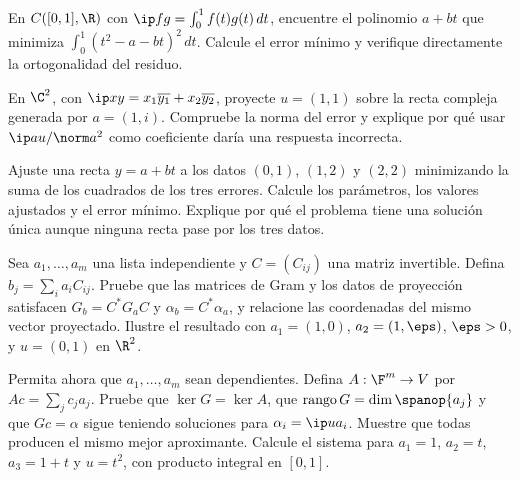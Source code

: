 \begin{ejercicio}\label{ej:ampl-gram-1}
En $C([0,1],\R)$ con $\ip fg=\int_0^1f(t)g(t)\,dt$, encuentre el polinomio $a+bt$ que minimiza $\int_0^1(t^2-a-bt)^2\,dt$. Calcule el error mínimo y verifique directamente la ortogonalidad del residuo.
\end{ejercicio}


\begin{ejercicio}\label{ej:ampl-gram-2}
En $\C^2$, con $\ip xy=x_1\overline{y_1}+x_2\overline{y_2}$, proyecte $u=(1,1)$ sobre la recta compleja generada por $a=(1,i)$. Compruebe la norma del error y explique por qué usar $\ip au/\norm a^2$ como coeficiente daría una respuesta incorrecta.
\end{ejercicio}


\begin{ejercicio}\label{ej:ampl-gram-3}
Ajuste una recta $y=a+bt$ a los datos $(0,1)$, $(1,2)$ y $(2,2)$ minimizando la suma de los cuadrados de los tres errores. Calcule los parámetros, los valores ajustados y el error mínimo. Explique por qué el problema tiene una solución única aunque ninguna recta pase por los tres datos.
\end{ejercicio}


\begin{ejercicio}\label{ej:ampl-gram-4}
Sea $a_1,\ldots,a_m$ una lista independiente y $C=(C_{ij})$ una matriz invertible. Defina $b_j=\sum_i a_iC_{ij}$. Pruebe que las matrices de Gram y los datos de proyección satisfacen $G_b=C^*G_aC$ y $\alpha_b=C^*\alpha_a$, y relacione las coordenadas del mismo vector proyectado. Ilustre el resultado con $a_1=(1,0)$, $a_2=(1,\eps)$, $\eps>0$, y $u=(0,1)$ en $\R^2$.
\end{ejercicio}


\begin{ejercicio}\label{ej:ampl-gram-5}
Permita ahora que $a_1,\ldots,a_m$ sean dependientes. Defina $A:\F^m\to V$ por $Ac=\sum_jc_ja_j$. Pruebe que $\ker G=\ker A$, que $\operatorname{rango}G=\dim\spanop\{a_j\}$ y que $Gc=\alpha$ sigue teniendo soluciones para $\alpha_i=\ip u{a_i}$. Muestre que todas producen el mismo mejor aproximante. Calcule el sistema para $a_1=1$, $a_2=t$, $a_3=1+t$ y $u=t^2$, con producto integral en $[0,1]$.
\end{ejercicio}


